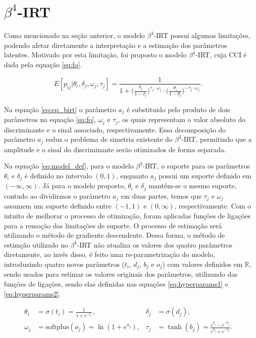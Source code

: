 \section{$\beta^{4}$-\gls{IRT}}

Como mencionado na seção anterior, o modelo $\beta^3$-\gls{IRT} possui algumas limitações, podendo afetar diretamente a interpretação e a estimação dos parâmetros latentes. Motivado por esta limitação, foi proposto o modelo $\beta^4$-\gls{IRT}, cuja \gls{CCI} é dada pela equação \ref{eq:fo}.

\begin{equation}
    \label{eq:fo}
    E[p_{ij} | \theta_i, \delta_j, \omega_j, \tau_j] = \frac{1}{1 + \big(\frac{\delta_j}{1 - \delta_j}\big)^{\tau_j\cdot\omega_j }\cdot\big(\frac{\theta_i}{1 - \theta_i}\big)^{-\tau_j\cdot\omega_j }}.
\end{equation}

Na equação \ref{eq:ep_birt} o parâmetro $a_j$ é substituido pelo produto de dois parâmetros na equação \ref{eq:fo}, $\omega_j$ e $\tau_j$, os quais representam o valor absoluto do discriminante e o sinal associado, respectivamente. Essa decomposição do parâmetro $a_j$ reduz o problema de simetria existente do $\beta^{3}$-\gls{IRT}, permitindo que a amplitude e o sinal do discriminante serão otimizados de forma separada.


Na equação \ref{eq:model_def}, para o modelo $\beta^{3}$-\gls{IRT}, o suporte para os parâmetros $\theta_i$ e $\delta_j$ é definido no intervalo $(0, 1)$, enquanto $a_j$ possui um suporte definido em $(-\infty, \infty)$. Já para o modelo proposto, $\theta_i$ e $\delta_j$ mantêm-se o mesmo suporte, contudo ao dividirmos o parâmetro $a_j$ em duas partes, temos que $\tau_j$ e $\omega_j$ assumem um suporte definido entre $(-1, 1)$ e $(0, \infty)$, respectivamente. Com o intuito de melhorar o processo de otimização, foram aplicadas funções de ligações para a remoção das limitações de suporte. O processo de estimação será utilizando o método de gradiente descendente. Dessa forma, o método de estimção utilizado no $\beta^{4}$-\gls{IRT} não atualiza os valores dos quatro parâmetros diretamente, ao invês disso, é feito uma re-parametrização do modelo, introduzindo quatro novos parâmetros ($t_i$, $d_j$, $b_j$ e $o_j$) com valores definidos em $\mathbb{R}$, sendo usados para estimar os valores originais dos parâmetros, utilizando das funções de ligações, sendo elas definidas nas equações \ref{eq:hyperparams1} e \ref{eq:hyperparams2}.


\begin{align}
\label{eq:hyperparams1}
    \theta_i &= \sigma(t_i) = \frac{1}{1 + e^{-t_i}}, & \delta_j &= \sigma(d_j), \\ %
    \label{eq:hyperparams2}
    \omega_j &= \text{softplus}(o_j) = \ln(1 + e^{o_j}), & \tau_j &= \tanh(b_j) = \frac{e^{b_j} - e^{-b_j}}{e^{b_j} + e^{-b_j}}. %
\end{align}

